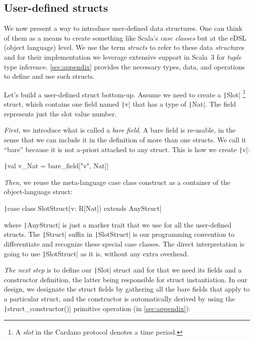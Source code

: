 \documentclass[11pt]{article}
\newcommand{\ScalaI}[1]{\texttt|#1|}
\newcommand{\OneTwoThreeX}[1]{\marginpar{\faCubes{ \smaller #1}}\xspace}
\newcommand{\OneTwoThree}{\OneTwoThreeX{}}
\newcommand{\FirstEtcX}[1]{\marginpar{\faCube{ \smaller #1}}\xspace}
\newcommand{\FirstEtc}{\FirstEtcX{}}
\begin{document}
\subsection{User-defined structs}

We now present a way to introduce user-defined data structures. One can think of them as a means to create something like Scala's \textit{case classes} but at the eDSL (object language) level. We use the term \textit{structs} to refer to these data \textit{struct}ures and for their implementation we leverage extensive support in Scala~3 for \textit{tuple} type inference. \autoref{sec:appendix} provides the necessary types, data, and operations to define and use such structs.

Let's build a user-defined struct bottom-up\OneTwoThree. Assume we need to create a \ScalaI{Slot}%
\footnote{A \textit{slot} in the Cardano protocol denotes a time period.} %
 struct, which contains one field named \ScalaI{v} that has a type of \ScalaI{Nat}. The field represents just the slot value number.

\textit{First}\FirstEtc, we introduce what is called a \textit{bare field}. A bare field is re-usable, in the sense that we can include it in the definition of more than one structs. We call it ``bare'' because it is not a-priori attached to any struct. This is how we create \ScalaI{v}:

\ScalaI{val v_Nat = bare_field["v", Nat]}

\textit{Then}\FirstEtc, we reuse the meta-language case class construct as a container of the object-language struct:

\ScalaI{case class SlotStruct(v: R[Nat]) extends AnyStruct}

\noindent where \ScalaI{AnyStruct} is just a marker trait that we use for all the user-defined structs. The \ScalaI{Struct} suffix in \ScalaI{SlotStruct} is our programming convention to differentiate and recognize these special case classes. The direct interpretation is going to use \ScalaI{SlotStruct} as it is, without any extra overhead.

\textit{The next step}\FirstEtc is to define our \ScalaI{Slot} struct and for that we need its fields and a constructor definition, the latter being responsible for struct instantiation. In our design, we designate the struct fields by gathering all the bare fields that apply to a particular struct, and the constructor is automatically derived by using the \ScalaI{struct_constructor()} primitive operation (in \autoref{sec:appendix}):
\end{document}
